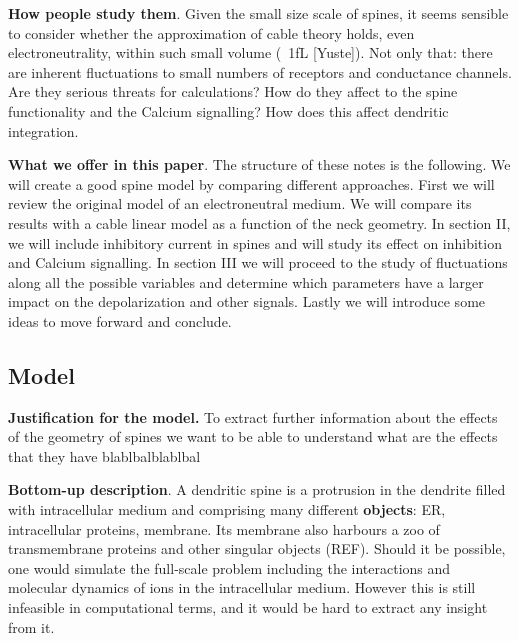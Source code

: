 \documentclass[10pt,letterpaper]{article}
\begin{document}
{\bf How people study them}. Given the small size scale of spines, it seems sensible to consider whether the approximation of cable theory holds, even electroneutrality, within such small volume (~1fL [Yuste]). Not only that: there are inherent fluctuations to small numbers of receptors and conductance  channels.  Are they serious threats for calculations? How do they affect to the spine functionality and the Calcium signalling? How does this affect dendritic integration.

{\bf What we offer in this paper}. 
The structure of these notes is the following. We will create a good spine model by comparing different approaches. First we will review the original model of an electroneutral medium. We will compare its results with a cable linear model as a function of the neck geometry. In section II, we will include inhibitory current in spines and will study its effect on inhibition and Calcium signalling. In section III we will proceed to the study of fluctuations along all the possible variables and determine which parameters have a larger impact on the depolarization and other signals. Lastly we will introduce some ideas to move forward and conclude.

\subsection*{Model}


{\bf Justification for the model. } To  extract further information about the effects of the geometry of spines we want to be able to understand what are the effects that they have blablbalblablbal

{\bf Bottom-up description}. A dendritic spine is a protrusion in the dendrite filled with intracellular medium and comprising many different {\bf objects}: ER, intracellular proteins, membrane. Its membrane also harbours a zoo of transmembrane proteins and other singular objects (REF). Should it be possible, one would simulate the full-scale problem including the interactions and molecular dynamics of ions in the intracellular medium. However this is still infeasible in computational terms, and it would be hard to extract any insight from it. 
\end{document}
